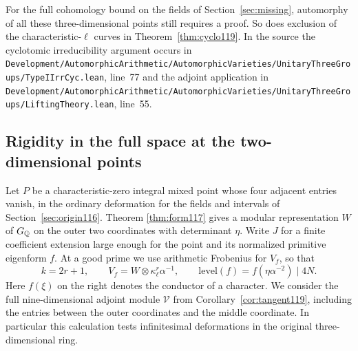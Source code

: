 \documentclass[a4paper,11pt]{article}
\theoremstyle{definition}
\theoremstyle{remark}
\newcommand{\srcloc}[2]{{\small\nolinkurl{#1.lean}}, line~#2}
\numberwithin{equation}{section}
\begin{document}
For the full cohomology bound on the fields of Section~\ref{sec:missing},
automorphy of all these three-dimensional points still requires
a proof. So does exclusion of the characteristic-\(\ell\)
curves in Theorem~\ref{thm:cyclo119}. In the source the
cyclotomic irreducibility argument occurs in
\srcloc{Development/AutomorphicArithmetic/AutomorphicVarieties/UnitaryThreeGroups/TypeIIrrCyc}{77}
and the adjoint application in
\srcloc{Development/AutomorphicArithmetic/AutomorphicVarieties/UnitaryThreeGroups/LiftingTheory}{55}.

\subsection{Rigidity in the full space at the two-dimensional points}\label{nav:IV-20}
\label{sec:rigid120}

Let \(P\) be a characteristic-zero integral mixed point whose
four adjacent entries vanish, in the ordinary deformation for
the fields and intervals of Section~\ref{sec:origin116}. Theorem
\ref{thm:form117} gives a modular representation \(W\) of
\(G_\mathbb Q\) on the outer two coordinates with determinant \(\eta\).
Write \(J\) for a finite coefficient extension large enough for
the point and its normalized primitive eigenform \(f\). At a
good prime we use arithmetic Frobenius for \(V_f\), so that
\[
  k=2r+1,\qquad V_f=W\otimes\kappa_\ell^r\alpha^{-1},
  \qquad \mathrm{level}(f)=f(\eta\alpha^{-2})\mid4N .
\]
Here \(f(\xi)\) on the right denotes the conductor of a
character. We consider the full nine-dimensional adjoint
module \(\mathcal V\) from Corollary~\ref{cor:tangent119},
including the entries between the outer coordinates and the
middle coordinate. In particular this calculation tests
infinitesimal deformations in the original three-dimensional ring.
\end{document}
